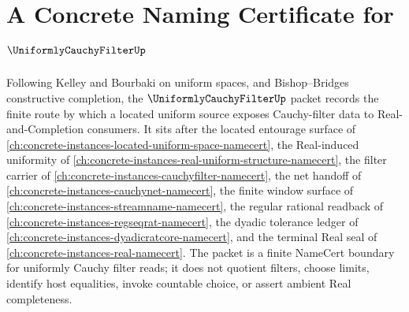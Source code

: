 \chapter{A Concrete Naming Certificate for $\UniformlyCauchyFilterUp$}
\label{ch:concrete-instances-uniformly-cauchy-filter-namecert}

Following Kelley and Bourbaki on uniform spaces, and Bishop--Bridges constructive completion, the $\UniformlyCauchyFilterUp$ packet records the finite route by which a located uniform source exposes Cauchy-filter data to Real-and-Completion consumers. It sits after the located entourage surface of \autoref{ch:concrete-instances-located-uniform-space-namecert}, the Real-induced uniformity of \autoref{ch:concrete-instances-real-uniform-structure-namecert}, the filter carrier of \autoref{ch:concrete-instances-cauchyfilter-namecert}, the net handoff of \autoref{ch:concrete-instances-cauchynet-namecert}, the finite window surface of \autoref{ch:concrete-instances-streamname-namecert}, the regular rational readback of \autoref{ch:concrete-instances-regseqrat-namecert}, the dyadic tolerance ledger of \autoref{ch:concrete-instances-dyadicratcore-namecert}, and the terminal Real seal of \autoref{ch:concrete-instances-real-namecert}. The packet is a finite NameCert boundary for uniformly Cauchy filter reads; it does not quotient filters, choose limits, identify host equalities, invoke countable choice, or assert ambient Real completeness.

